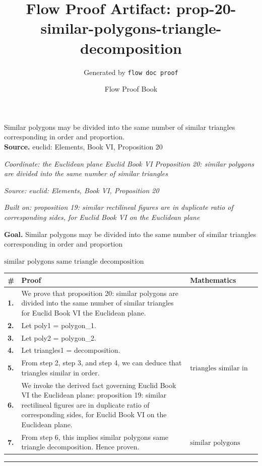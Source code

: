 \documentclass[11pt]{article}
\title{Flow Proof Artifact: prop-20-similar-polygons-triangle-decomposition}
\author{Generated by \texttt{flow doc proof}}
\date{Flow Proof Book}
\theoremstyle{definition}
\begin{document}
\maketitle
Similar polygons may be divided into the same number of similar triangles corresponding in order and proportion.\\[0.5em]
\textbf{Source.} euclid: Elements, Book VI, Proposition 20\\[0.5em]
\bigskip
{}\par
\smallskip\noindent\textit{Coordinate: the Euclidean plane \cdot Euclid Book VI \cdot Proposition 20: similar polygons are divided into the same number of similar triangles}\par
\smallskip\noindent\textit{Source: euclid: Elements, Book VI, Proposition 20}\par
\smallskip\noindent\textit{Built on: proposition 19: similar rectilineal figures are in duplicate ratio of corresponding sides, for Euclid Book VI on the Euclidean plane}\par
\medskip
\noindent\textbf{Goal.} Similar polygons may be divided into the same number of similar triangles corresponding in order and proportion\par
\noindent$\displaystyle \text{similar polygons same triangle decomposition}$\par
\medskip
\noindent
\begin{tabular}{@{} >{\raggedright\arraybackslash}p{} >{\raggedright\arraybackslash}p{} >{\raggedleft\arraybackslash}p{} @{}}
\textbf{\#} & \textbf{Proof} & \textbf{Mathematics} \\
\midrule
\textbf{1.} & We prove that proposition 20: similar polygons are divided into the same number of similar triangles for Euclid Book VI the Euclidean plane. & \\[0.45em]
\textbf{2.} & Let poly1 = polygon\_1. & \\[0.45em]
\textbf{3.} & Let poly2 = polygon\_2. & \\[0.45em]
\textbf{4.} & Let triangles1 = decomposition. & \\[0.45em]
\textbf{5.} & From step 2, step 3, and step 4, we can deduce that triangles similar in order. & $\displaystyle \text{triangles similar in order}$ \\[0.45em]
\textbf{6.} & We invoke the derived fact governing Euclid Book VI the Euclidean plane: proposition 19: similar rectilineal figures are in duplicate ratio of corresponding sides, for Euclid Book VI on the Euclidean plane. & \\[0.45em]
\textbf{7.} & From step 6, this implies similar polygons same triangle decomposition. Hence proven. & $\displaystyle \text{similar polygons same triangle decomposition}$ \\[0.45em]
\bottomrule
\end{tabular}
\label{thm:Geometry-Euclid Book VI-proposition_20_similar_polygons_are_divided_into_the_same_number_of_similar_triangles}
\par\medskip\hrule
\end{document}
